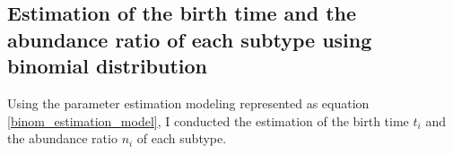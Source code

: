 \documentclass{article}
\begin{document}
\subsection{Estimation of the birth time and the abundance ratio of each subtype using binomial distribution}
Using the parameter estimation modeling represented as equation \eqref{binom_estimation_model}, I conducted the estimation of the birth time $t_i$ and the abundance ratio $n_i$ of each subtype.



\end{document}
